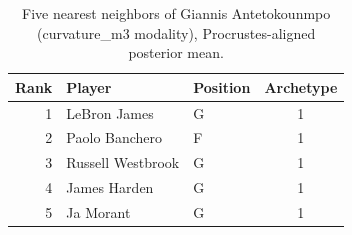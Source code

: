 \begin{table}[htbp]
  \centering\small
  \begin{tabular}{rllc}
    \toprule
    Rank & Player & Position & Archetype \\
    \midrule
    1 & LeBron James & G & 1 \\
    2 & Paolo Banchero & F & 1 \\
    3 & Russell Westbrook & G & 1 \\
    4 & James Harden & G & 1 \\
    5 & Ja Morant & G & 1 \\
    \bottomrule
  \end{tabular}
  \caption{Five nearest neighbors of Giannis Antetokounmpo (curvature_m3 modality), Procrustes-aligned posterior mean.}
  \label{tab:Giannis_Antetokounmpo_neighbors_curvature_m3}
\end{table}

